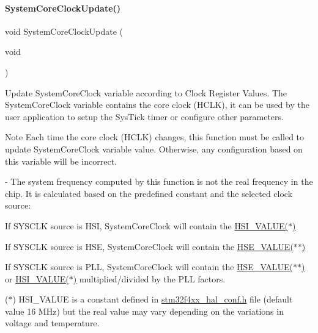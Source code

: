 \paragraph{\texorpdfstring{System\+Core\+Clock\+Update()}{SystemCoreClockUpdate()}}
{\footnotesize\ttfamily void System\+Core\+Clock\+Update (\begin{DoxyParamCaption}\item[{void}]{ }\end{DoxyParamCaption})}



Update System\+Core\+Clock variable according to Clock Register Values. The System\+Core\+Clock variable contains the core clock (H\+C\+LK), it can be used by the user application to setup the Sys\+Tick timer or configure other parameters. 

\begin{DoxyNote}{Note}
Each time the core clock (H\+C\+LK) changes, this function must be called to update System\+Core\+Clock variable value. Otherwise, any configuration based on this variable will be incorrect.

-\/ The system frequency computed by this function is not the real frequency in the chip. It is calculated based on the predefined constant and the selected clock source\+:
\end{DoxyNote}

\begin{DoxyItemize}
\item If S\+Y\+S\+C\+LK source is H\+SI, System\+Core\+Clock will contain the \hyperlink{group___s_t_m32_f4xx___system___private___includes_gaaa8c76e274d0f6dd2cefb5d0b17fbc37}{H\+S\+I\+\_\+\+V\+A\+L\+U\+E($\ast$)}
\item If S\+Y\+S\+C\+LK source is H\+SE, System\+Core\+Clock will contain the \hyperlink{group___s_t_m32_f4xx___system___private___includes_gaeafcff4f57440c60e64812dddd13e7cb}{H\+S\+E\+\_\+\+V\+A\+L\+U\+E($\ast$$\ast$)}
\item If S\+Y\+S\+C\+LK source is P\+LL, System\+Core\+Clock will contain the \hyperlink{group___s_t_m32_f4xx___system___private___includes_gaeafcff4f57440c60e64812dddd13e7cb}{H\+S\+E\+\_\+\+V\+A\+L\+U\+E($\ast$$\ast$)} or \hyperlink{group___s_t_m32_f4xx___system___private___includes_gaaa8c76e274d0f6dd2cefb5d0b17fbc37}{H\+S\+I\+\_\+\+V\+A\+L\+U\+E($\ast$)} multiplied/divided by the P\+LL factors.
\end{DoxyItemize}

($\ast$) H\+S\+I\+\_\+\+V\+A\+L\+UE is a constant defined in \hyperlink{stm32f4xx__hal__conf_8h}{stm32f4xx\+\_\+hal\+\_\+conf.\+h} file (default value 16 M\+Hz) but the real value may vary depending on the variations in voltage and temperature.

